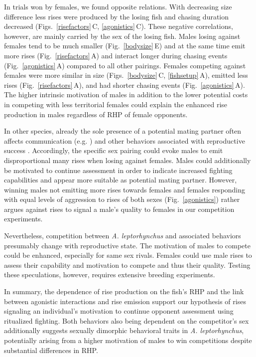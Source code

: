 \documentclass[vruler,JEB]{COB}%
\newcommand{\lepto}{\textit{A. leptorhynchus}}
\newcommand{\panel}[1]{\textsf{#1}}
\newcommand{\fref}[1]{\textup{\ref{#1}}}
\newcommand{\subfref}[2]{\textup{\ref{#1}}\,\panel{#2}}
\newcommand{\Fig}{Fig.}
\newcommand{\Figref}[1]{\Fig~\fref{#1}}
\newcommand{\Subfigref}[2]{\Fig~\subfref{#1}{#2}}
\newcommand{\Figsb}{Figs.}
\newcommand{\Subfigsrefb}[2]{\Figsb~\subfref{#1}{#2}}
\begin{document}
In trials won by females, we found opposite relations. With decreasing size difference less rises were produced by the losing fish and chasing duration decreased (\Subfigsrefb{risefactors}{C}, \subfref{agonistics}{C}). These negative correlations, however, are mainly carried by the sex of the losing fish. Males losing against females tend to be much smaller (\Subfigref{bodysize}{E}) and at the same time emit more rises (\Subfigref{risefactors}{A}) and interact longer during chasing events (\Subfigref{agonistics}{A}) compared to all other pairings. Females competing against females were more similar in size (\Subfigsrefb{bodysize}{C}, \subfref{fishsetup}{A}), emitted less rises (\Subfigref{risefactors}{A}), and had shorter chasing events (\Subfigref{agonistics}{A}). The higher intrinsic motivation of males in addition to the lower potential costs in competing with less territorial females could explain the enhanced rise production in males regardless of RHP of female opponents.

In other species, already the sole presence of a potential mating partner often affects communication (e.g. \citealp{Barske2015}) and other behaviors associated with reproductive success \citep{Taylor1975}. Accordingly, the specific sex pairing could evoke males to emit disproportional many rises when losing against females. Males could additionally be motivated to continue assessment in order to indicate increased fighting capabilities and appear more suitable as potential mating partner. However, winning males not emitting more rises towards females and females responding with equal levels of aggression to rises of both sexes (\Figref{agonistics}) rather argues against rises to signal a male's quality to females in our competition experiments.

Nevertheless, competition between \lepto{} and associated behaviors presumably change with reproductive state. The motivation of males to compete could be enhanced, especially for same sex rivals. Females could use male rises to assess their capability and motivation to compete and thus their quality. Testing these speculations, however, requires extensive breeding experiments.

In summary, the dependence of rise production on the fish's RHP and the link between agonistic interactions and rise emission support our hypothesis of rises signaling an individual's motivation to continue opponent assessment using ritualized fighting. Both behaviors also being dependent on the competitor's sex additionally suggests sexually dimorphic behavioral traits in \lepto{}, potentially arising from a higher motivation of males to win competitions despite substantial differences in RHP. 
\end{document}
